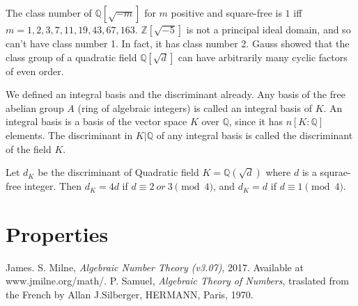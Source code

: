 \documentclass[11pt,a4paper,reqno]{amsart}
\numberwithin{equation}{section}
\begin{document}
The class number of $\mathbb{Q}[\sqrt{-m}]$ for $m$ positive and square-free is $1$ iff $m=1,2,3,7,11,19,43,67,163$.
$\mathbb{Z}[\sqrt{-5}]$ is not a principal ideal domain, and so can't have class number 1. 
In fact, it has class number 2.
Gauss showed that the class group of a quadratic field $\mathbb{Q}[\sqrt{d}]$ can have arbitrarily many cyclic factors of even order.

We defined an integral basis and the discriminant already. 
Any basis of the free abelian group $A$ (ring of algebraic integers) is called an integral basis of $K$. 
An integral basis is a basis of the vector space $K$ over $\mathbb{Q}$, since it has $n[K:\mathbb{Q}]$ elements.
The discriminant in $K|\mathbb{Q}$ of any integral basis is called the discriminant of the field $K$.

Let $d_K$ be the discriminant  of Quadratic field $K=\mathbb{Q}(\sqrt{d})$ where $d$ is a squrae-free integer.
Then $d_K = 4d$ if $d \equiv 2~or~3 \pmod 4$, and $d_K = d$ if $d \equiv 1  \pmod 4$.
\section{Properties}

 



\begin{thebibliography}{alpha} 
 James. S. Milne, \emph{Algebraic Number Theory (v3.07)}, 2017. Available at www.jmilne.org/math/. 
 P. Samuel, \emph{Algebraic Theory of Numbers}, traslated from the French by Allan J.Silberger, HERMANN, Paris, 1970.
\end{thebibliography} 
\end{document}
